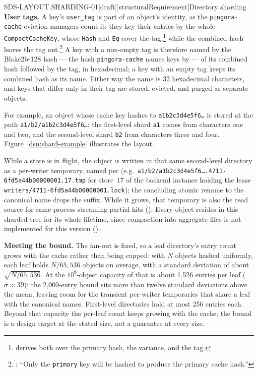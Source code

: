\begin{requirement}{SDS-LAYOUT.SHARDING-01}[draft][structuralRequirement]{Directory sharding}
  \textbf{User tags.} A key's \texttt{user\_tag} is part of an object's
  identity, as the \texttt{pingora-cache} eviction managers count it: they key
  their entries by the whole \texttt{CompactCacheKey}, whose \texttt{Hash}
  and \texttt{Eq} cover the
  tag,\footnote{
  derives both over the primary hash, the variance, and the tag.} while the
  combined hash leaves the tag
  out.\footnote{:
  ``Only the \texttt{primary} key will be hashed to produce the primary cache
  hash.''} A key with a non-empty tag is therefore named by the Blake2b-128
  hash --- the hash \texttt{pingora-cache} names keys by --- of its combined
  hash followed by the tag, in hexadecimal; a key with an empty tag keeps its
  combined hash as its name. Either way the name is 32 hexadecimal
  characters, and keys that differ only in their tag are stored, evicted, and
  purged as separate objects.

  For example, an object whose cache key hashes to \texttt{a1b2c3d4e5f6\dots} is stored at
  the path \texttt{a1/b2/a1b2c3d4e5f6\dots}: the first-level shard \texttt{a1} comes
  from characters one and two, and the second-level shard \texttt{b2} from
  characters three and four. Figure~\ref{dsn:shard-example} illustrates the layout.

  While a store is in flight, the object is written in that same
  second-level directory as a per-writer temporary, named per
   (e.g.\
  \texttt{a1/b2/a1b2c3d4e5f6\dots.4711-6fd5a44b00000001.17.tmp} for store~17
  of the backend instance holding the lease
  \texttt{writers/4711-6fd5a44b00000001.lock});
  the concluding atomic rename to the canonical name drops the suffix.
  While it grows, that temporary is also the read source for same-process
  streaming partial hits (\reqref{FRE-COMPAT.STREAMING-01}). Every object
  resides in this sharded tree for its whole lifetime, since compaction into
  aggregate files is not implemented for this version
  ().

  \textbf{Meeting the bound.} The fan-out is fixed, so a leaf directory's
  entry count grows with the cache rather than being capped: with $N$
  objects hashed uniformly, each leaf holds $N/65{,}536$ objects on average,
  with a standard deviation of about $\sqrt{N/65{,}536}$. At the
  $10^8$-object capacity of \reqref{REQ-EFFICIENCY.DIRSCALE-01} that is about
  1,526 entries per leaf ($\sigma \approx 39$); the 2,000-entry bound sits
  more than twelve standard deviations above the mean, leaving room for the
  transient per-writer temporaries that share a leaf with the canonical
  names. First-level directories hold at most 256 entries each. Beyond that
  capacity the per-leaf count keeps growing with the cache; the bound is a
  design target at the stated size, not a guarantee at every size.


\end{requirement}
